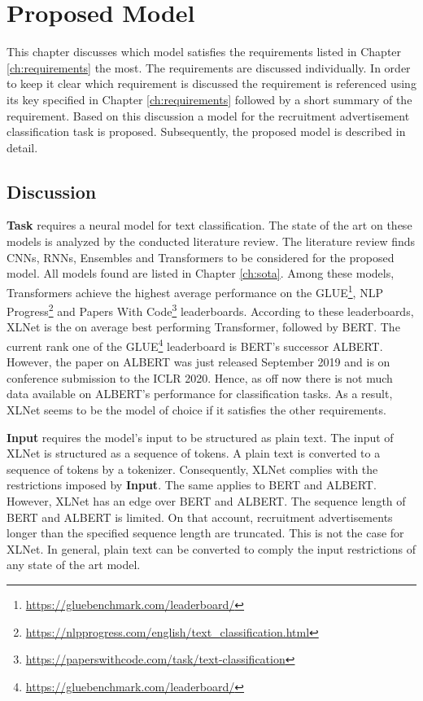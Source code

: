 \chapter{Proposed Model}
\label{ch:model}
This chapter discusses which model satisfies the requirements listed in Chapter \ref{ch:requirements} the most. The requirements are discussed individually. In order to keep it clear which requirement is discussed the requirement is referenced using its key specified in Chapter \ref{ch:requirements} followed by a short summary of the requirement. Based on this discussion a model for the recruitment advertisement classification task is proposed. Subsequently, the proposed model is described in detail. 
\section{Discussion}
\label{sec:discussion}
\textbf{Task} requires a neural model for text classification. The state of the art on these models is analyzed by the conducted literature review. The literature review finds \ac{CNN}s, \ac{RNN}s, Ensembles and Transformers to be considered for the proposed model. All models found are listed in Chapter \ref{ch:sota}. Among these models, Transformers achieve the highest average performance on the GLUE\footnote{\url{https://gluebenchmark.com/leaderboard/}}, NLP Progress\footnote{\url{https://nlpprogress.com/english/text_classification.html}} and Papers With Code\footnote{\url{https://paperswithcode.com/task/text-classification}} leaderboards. According to these leaderboards, XLNet\autocite{Yang.2019} is the on average best performing Transformer, followed by BERT\autocite{Devlin.2018}. The current rank one of the GLUE\footnote{\url{https://gluebenchmark.com/leaderboard/}} leaderboard is BERT's successor ALBERT\autocite{Lan.2019}. However, the paper on ALBERT was just released September 2019 and is on conference submission to the ICLR 2020. Hence, as off now there is not much data available on ALBERT's performance for classification tasks. As a result, XLNet seems to be the model of choice if it satisfies the other requirements.
\par
\textbf{Input} requires the model's input to be structured as plain text. The input of XLNet is structured as a sequence of tokens.\autocite{Yang.2019} A plain text is converted to a sequence of tokens by a tokenizer. Consequently, XLNet complies with the restrictions imposed by \textbf{Input}. The same applies to BERT and ALBERT. However, XLNet has an edge over BERT and ALBERT. The sequence length of BERT and ALBERT is limited.\autocites{Devlin.2018}{Lan.2019} On that account, recruitment advertisements longer than the specified sequence length are truncated. This is not the case for XLNet.\autocite{Yang.2019} In general, plain text can be converted to comply the input restrictions of any state of the art model.
